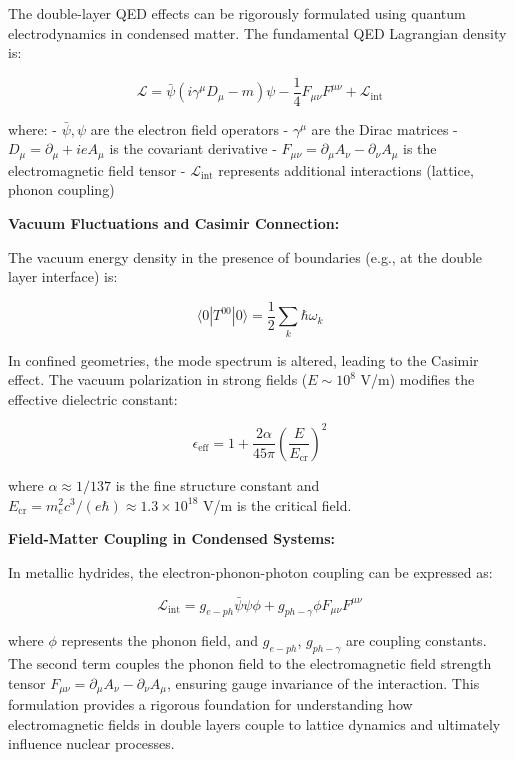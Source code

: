 \documentclass[11pt,a4paper]{article}
\begin{document}
The double-layer QED effects can be rigorously formulated using quantum electrodynamics in condensed matter. The fundamental QED Lagrangian density is:

\begin{equation}
\mathcal{L} = \bar{\psi}(i\gamma^\mu D_\mu - m)\psi - \frac{1}{4}F_{\mu\nu}F^{\mu\nu} + \mathcal{L}_{\text{int}}
\end{equation}

where: - $\bar{\psi}, \psi$ are the electron field operators - $\gamma^\mu$ are the Dirac matrices - $D_\mu = \partial_\mu + ieA_\mu$ is the covariant derivative - $F_{\mu\nu} = \partial_\mu A_\nu - \partial_\nu A_\mu$ is the electromagnetic field tensor - $\mathcal{L}_{\text{int}}$ represents additional interactions (lattice, phonon coupling)

\textbf{Vacuum Fluctuations and Casimir Connection:}

The vacuum energy density in the presence of boundaries (e.g., at the double layer interface) is:

\begin{equation}
\langle 0 | T^{00} | 0 \rangle = \frac{1}{2} \sum_k \hbar \omega_k
\end{equation}

In confined geometries, the mode spectrum is altered, leading to the Casimir effect. The vacuum polarization in strong fields ($E \sim 10^8$ V/m) modifies the effective dielectric constant:

\begin{equation}
\epsilon_{\text{eff}} = 1 + \frac{2\alpha}{45\pi} \left(\frac{E}{E_{\text{cr}}}\right)^2
\end{equation}

where $\alpha \approx 1/137$ is the fine structure constant and $E_{\text{cr}} = m_e^2 c^3 / (e\hbar) \approx 1.3 \times 10^{18}$ V/m is the critical field.

\textbf{Field-Matter Coupling in Condensed Systems:}

In metallic hydrides, the electron-phonon-photon coupling can be expressed as:

\begin{equation}
\mathcal{L}_{\text{int}} = g_{e-ph} \bar{\psi} \psi \phi + g_{ph-\gamma} \phi F_{\mu\nu} F^{\mu\nu}
\end{equation}

where $\phi$ represents the phonon field, and $g_{e-ph}$, $g_{ph-\gamma}$ are coupling constants. The second term couples the phonon field to the electromagnetic field strength tensor $F_{\mu\nu} = \partial_\mu A_\nu - \partial_\nu A_\mu$, ensuring gauge invariance of the interaction. This formulation provides a rigorous foundation for understanding how electromagnetic fields in double layers couple to lattice dynamics and ultimately influence nuclear processes.
\end{document}
